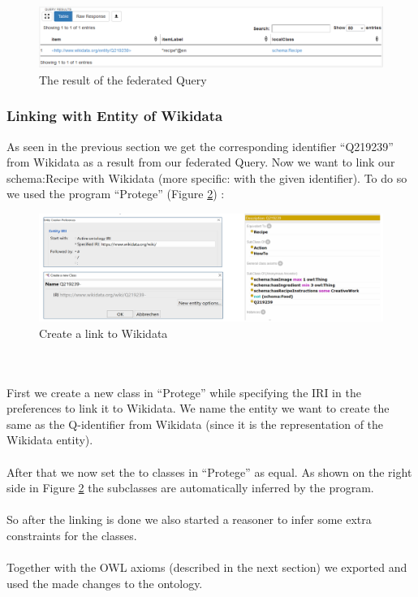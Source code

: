 \documentclass{article}
\begin{document}
\begin{figure}[H]
  \centering
  \includegraphics[width=12cm]{pictures/fed_query_result.png}
  \caption{The result of the federated Query}
  \label{fig:fed_res}
\end{figure}
\noindent

\subsubsection{Linking with Entity of Wikidata}
As seen in the previous section we get the corresponding identifier ``Q219239'' from Wikidata as a result from our federated Query. Now we want to link our schema:Recipe with Wikidata (more specific: with the given identifier). To do so we used the program ``Protege'' (Figure \ref{fig:lod}) :

\begin{figure}[H]
  \centering
  \includegraphics[width=15cm]{pictures/lod_linking.png}
  \caption{Create a link to Wikidata}
  \label{fig:lod}
\end{figure}
\noindent
\\ \\
First we create a new class in ``Protege'' while specifying the IRI in the preferences to link it to Wikidata. We name the entity we want to create the same as the Q-identifier from Wikidata (since it is the representation of the Wikidata entity). \\ \\
After that we now set the to classes in ``Protege'' as equal. As shown on the right side in Figure \ref{fig:lod} the subclasses are automatically inferred by the program. \\ \\
So after the linking is done we also started a reasoner to infer some extra constraints for the classes.\\ \\
Together with the OWL axioms (described in the next section) we exported and used the made changes to the ontology.
\end{document}
